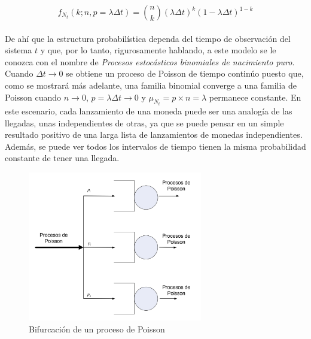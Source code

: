 \begin{equation}
    f_{N_{t}}\left ( k;n,p=\lambda \Delta t \right ) = \binom{n}{k}\left ( \lambda \Delta t \right )^{k}\left ( 1 - \lambda \Delta t \right )^{1-k}
    \label{eqn:1.6}
\end{equation}
\\
De ahí que la estructura probabilística dependa del tiempo de observación del sistema $ t $ y que, por lo tanto, rigurosamente hablando, a este modelo se le conozca con el nombre de \textit{Procesos estocásticos binomiales de nacimiento puro}. Cuando $ \Delta t \rightarrow 0 $ se obtiene un proceso de Poisson de tiempo continúo puesto que, como se mostrará más adelante, una familia binomial converge a una familia de Poisson cuando $ n \rightarrow 0 $, $ p=\lambda \Delta t  \rightarrow 0 $ y $ \mu _{N_{t}}= p \times n = \lambda $  permanece constante. En este escenario, cada lanzamiento de una moneda puede ser una analogía de las llegadas, unas independientes de otras, ya que se puede pensar en un simple resultado positivo de una larga lista de lanzamientos de monedas independientes. Además, se puede ver todos los intervalos de tiempo tienen la misma probabilidad constante de tener una llegada.


\begin{figure}[H]
\centering
\includegraphics[width=3in]{chapters/chapter3/figures/Figura1-2:BifurcaciondeunprocesodePoisson.png}
\caption[Bifurcación de un proceso de Poisson]{Bifurcación de un proceso de Poisson}
\label{fig:mesh2}
\end{figure}

